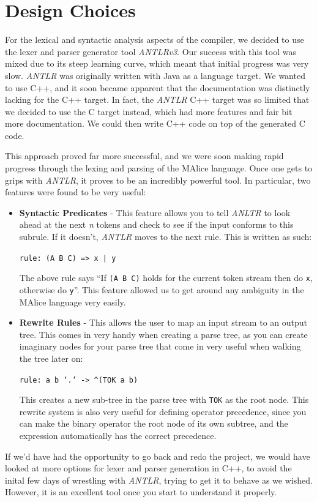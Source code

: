\documentclass[11pt, notitlepage]{report}
\begin{document}
\section*{Design Choices}
For the lexical and syntactic analysis aspects of the compiler, we decided to use the lexer and parser generator tool \emph{ANTLRv3}. Our success with this tool was mixed due to its steep learning curve, which meant that initial progress was very slow. \emph{ANTLR} was originally written with Java as a language target. We wanted to use C++, and it soon became apparent that the documentation was distinctly lacking for the C++ target. In fact, the \emph{ANTLR} C++ target was so limited that we decided to use the C target instead, which had more features and fair bit more documentation. We could then write C++ code on top of the generated C code.

This approach proved far more successful, and we were soon making rapid progress through the lexing and parsing of the MAlice language. Once one gets to grips with \emph{ANTLR}, it proves to be an incredibly powerful tool. In particular, two features were found to be very useful:
\begin{itemize}
\item \textbf{Syntactic Predicates} - This feature allows you to tell \emph{ANLTR} to look ahead at the next \emph{n} tokens and check to see if the input conforms to this subrule. If it doesn't, \emph{ANTLR} moves to the next rule. This is written as such:
\begin{center}
	\texttt{rule: (A B C) => x | y}
\end{center}
The above rule says ``If \texttt{(A B C)} holds for the current token stream then do \texttt{x}, otherwise do \texttt{y}''. This feature allowed us to get around any ambiguity in the MAlice language very easily.

\item \textbf{Rewrite Rules} - This allows the user to map an input stream to an output tree. This comes in very handy when creating a parse tree, as you can create imaginary nodes for your parse tree that come in very useful when walking the tree later on:
\begin{center}
	\texttt{rule: a b `.' -> \textasciicircum(TOK a b)}
\end{center}
This creates a new sub-tree in the parse tree with \texttt{TOK} as the root node. This rewrite system is also very useful for defining operator precedence, since you can make the binary operator the root node of its own subtree, and the expression automatically has the correct precedence.
\end{itemize}
If we'd have had the opportunity to go back and redo the project, we would have looked at more options for lexer and parser generation in C++, to avoid the inital few days of wrestling with \emph{ANTLR}, trying to get it to behave as we wished. However, it is an excellent tool once you start to understand it properly.
\end{document}

